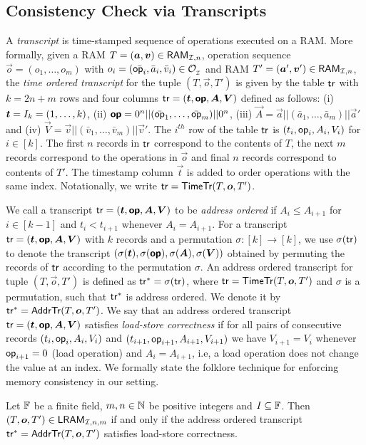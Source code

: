 \subsection{Consistency Check via Transcripts}\label{subsec:transcripts}
A {\em transcript} is time-stamped sequence of operations executed on a RAM.
More formally, given a RAM $T=(\vec{a},\vec{v})\in \RAM{I}{n}$,
operation sequence $\vec{o}=(o_1,\ldots,o_m)$ with $o_i=(\bar{\mathsf{op}_i},\bar{a}_i,\bar{v}_i)\in \mathcal{O}_{{}_\mathcal{I}}$ and RAM $T'=(\vec{a}', \vec{v}')\in \RAM{I}{n}$,
the {\em time ordered transcript} for the tuple $(T,\vec{o},T')$ is given by the table $\mathsf{tr}$ with $k=2n+m$ rows and four columns
$\tr = (\vec{t},\vec{\op},\vec{A},\vec{V})$  defined as follows: (i) $\vec{t}=\setind_{k}=(1,\ldots,k)$,
(ii) $\vec{\op}=0^n||(\bar{\op}_1,\ldots,\bar{\op}_m)||0^n$,
(iii) $\vec{A}=\vec{a}||(\bar{a}_1,\ldots,\bar{a}_m)||\vec{a}'$ and
(iv) $\vec{V}=\vec{v}||(\bar{v}_1,\ldots,\bar{v}_m)||\vec{v}'$. The $i^{th}$ row of the table $\mathsf{tr}$ is
$(t_i,\mathsf{op}_i,A_i,V_i)$ for $i\in [k]$. The first $n$ records in $\mathsf{tr}$ correspond to the contents of $T$,
the next $m$ records correspond to the operations in $\vec{o}$ and final $n$
records correspond to contents of $T'$. The timestamp column $\vec{t}$ is added to order operations with the same index.
Notationally, we write $\tr=\TOT(T,\vec{o},T')$.

We call a transcript $\tr=(\vec{t},\vec{\op},\vec{A},\vec{V})$ to be {\em address ordered} if $A_i\leq A_{i+1}$ for $i\in [k-1]$ and
$t_i < t_{i+1}$ whenever $A_i=A_{i+1}$. For a transcript $\tr=(\vec{t},\vec{\op},\vec{A},\vec{V})$ with $k$ records and a
permutation $\sigma:[k]\rightarrow [k]$, we use $\sigma(\mathsf{tr})$ to denote the transcript
$(\sigma(\vec{t}),\sigma(\vec{\op}),\sigma(\vec{A}),\sigma(\vec{V}))$
obtained by permuting the records of $\mathsf{tr}$ according to the permutation $\sigma$.
An address ordered transcript for tuple $(T,\vec{o},T')$ is defined as $\mathsf{tr}^\ast=\sigma(\mathsf{tr})$, where $\tr=\TOT(T,\vec{o},T')$ and $\sigma$ is
a permutation, such that $\mathsf{tr}^\ast$ is address ordered. We denote it by $\tr^\ast=\AOT(T,\vec{o},T')$.
We say that an address ordered transcript $\tr=(\vec{t},\vec{\op},\vec{A},\vec{V})$ satisfies {\em load-store correctness}
if for all pairs of consecutive records $(t_i,\mathsf{op}_i,A_i,V_i)$ and $(t_{i+1},\mathsf{op}_{i+1},A_{i+1},V_{i+1})$ we have $V_{i+1}=V_i$
whenever $\mathsf{op}_{i+1}=0$ (load operation) and
$A_i=A_{i+1}$, i.e, a load operation does not change the value at an index.
We formally state the folklore technique for enforcing memory consistency in our setting.
\begin{lemma}\label{lem:consistency-check}
Let $\mathbb{F}$ be a finite field, $m,n\in \mathbb{N}$ be positive integers and $I\subseteq \mathbb{F}$. Then $(T,\vec{o},T')\in \LRAM{I}{n}{m}$ if and only if
    the address ordered transcript $\tr^\ast=\AOT(T,\vec{o},T')$ satisfies load-store correctness.
\end{lemma}


